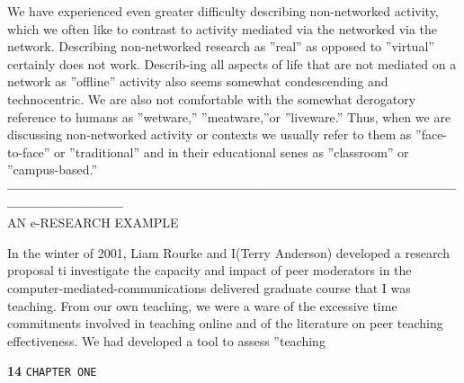 \documentclass{book}
\begin{document}
 \hspace*{0.4cm} We have experienced even greater difficulty describing non-networked activity, which we often like to contrast to activity mediated via the networked via the network. Describing non-networked research as ''real'' as opposed to ''virtual'' certainly does not work. Describ-ing all aspects of life that are not mediated on a network as ''offline'' activity also seems somewhat condescending and technocentric. We are also not comfortable with the somewhat derogatory reference to humans as ''wetware,'' ''meatware,''or ''liveware.'' Thus, when we are discussing non-networked activity or contexts we usually refer to them as ''face-to-face'' or ''traditional'' and in their educational senes as ''classroom'' or ''campus-based.''\\

\vspace*{0.6cm}
\textbf{---------------------------------------------------------------------------------------------------------------------}\\
\large{
AN e-RESEARCH EXAMPLE
}

\vspace*{0.3cm}
 In the winter of 2001, Liam Rourke and I(Terry Anderson) developed a research proposal ti investigate the capacity and impact of peer moderators in the computer-mediated-communications delivered graduate course that I was teaching. From our own teaching, we were a ware of the excessive time commitments involved in teaching online and of the literature on peer teaching effectiveness. We had developed a tool to assess ''teaching \\

 \newpage
 \begin{flushleft}
\textbf{14}\hspace*{1cm} \texttt{CHAPTER ONE}
\end{flushleft}
\end{document}
